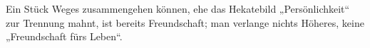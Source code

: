 Ein Stück Weges zusammengehen können, ehe das Hekatebild „Persönlichkeit“ zur Trennung mahnt, ist bereits Freundschaft; man verlange nichts Höheres, keine „Freundschaft fürs Leben“.
\par

